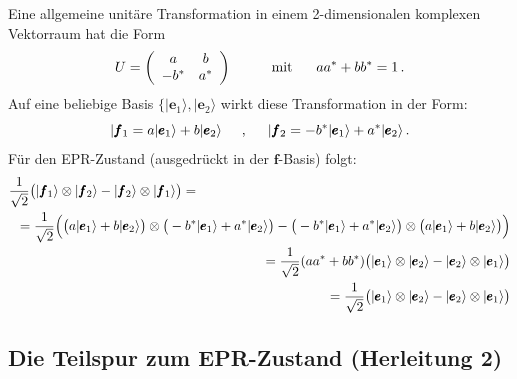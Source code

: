 Eine allgemeine unit\"are Transformation in einem 2-dimensionalen komplexen
Vektorraum hat die Form
\begin{equation}
             U = \left( \begin{array}{cc} a & b \\ - b^* & a^* \end{array} \right)
             \hspace{1cm} {\rm mit} \hspace{0.6cm}  a a^* + b b^* = 1 \, . 
\end{equation}
Auf eine beliebige Basis $\{ |\pmb{e}_1 \rangle, |\pmb{e}_2\rangle$ wirkt diese Transformation
in der Form:
\begin{equation}
    | \pmb{f}_1 = a | \pmb{e}_1 \rangle + b |\pmb{e}_2 \rangle \hspace{0.5cm} , \hspace{0.5cm}
     | \pmb{f}_2 = -b^* | \pmb{e}_1\rangle + a^* |\pmb{e}_2 \rangle \, . 
\end{equation}
F\"ur den EPR-Zustand (ausgedr\"uckt in der $\pmb{f}$-Basis) folgt:
\begin{eqnarray}
    \frac{1}{\sqrt{2}} \big(  | \pmb{f}_1 \rangle \otimes | \pmb{f}_2 \rangle - 
        | \pmb{f}_2 \rangle \otimes | \pmb{f}_1 \rangle \big)  & = & \\ 
        & &  \hspace*{-5cm} =
    \frac{1}{\sqrt{2}} \Big(  \big( a | \pmb{e}_1 \rangle + b |\pmb{e}_2 \rangle \big) 
        \otimes  \big(  -b^* | \pmb{e}_1\rangle + a^* |\pmb{e}_2 \rangle \big)
         -  \big( -b^* | \pmb{e}_1\rangle + a^* |\pmb{e}_2 \rangle \big) 
            \otimes \big(  a | \pmb{e}_1 \rangle + b |\pmb{e}_2 \rangle \big)  \Big)       \\   
        & &  \hspace*{-5cm} =
  \frac{1}{\sqrt{2}} ( a a^* + b b^*) \big( | \pmb{e}_1 \rangle \otimes | \pmb{e}_2 \rangle - 
        | \pmb{e}_2 \rangle \otimes | \pmb{e}_1 \rangle \big)  \\
                & &  \hspace*{-5cm} =
  \frac{1}{\sqrt{2}} \big( | \pmb{e}_1 \rangle \otimes | \pmb{e}_2 \rangle - 
        | \pmb{e}_2 \rangle \otimes | \pmb{e}_1 \rangle \big)  
\end{eqnarray}

\subsection*{Die Teilspur zum EPR-Zustand (Herleitung 2)}
\label{sec_EPR_B}

